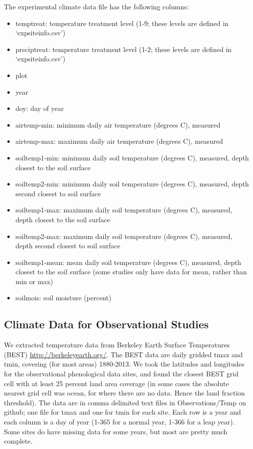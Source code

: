 \documentclass{article}
\begin{document}
The experimental climate data file has the following columns:
\begin{itemize}
  \item temptreat: temperature treatment level (1-9; these levels are defined in `expsiteinfo.csv')
 \item preciptreat: temperature treatment level (1-2; these levels are defined in `expsiteinfo.csv')
 \item plot
 \item year
 \item doy: day of year
 \item airtemp-min: minimum daily air temperature (degrees C), measured
 \item airtemp-max: maximum daily air temperature (degrees C), measured
 \item soiltemp1-min: minimum daily soil temperature (degrees C), measured, depth closest to the soil surface
 \item soiltemp2-min: minimum daily soil temperature (degrees C), measured, depth second closest to soil surface
 \item soiltemp1-max: maximum daily soil temperature (degrees C), measured, depth closest to the soil surface
 \item soiltemp2-max: maximum daily soil temperature (degrees C), measured, depth second closest to soil surface
 \item soiltemp1-mean: mean daily soil temperature (degrees C), measured, depth closest to the soil surface (some studies only have data for mean, rather than min or max)
 \item soilmois: soil moisture (percent)
 
\end{itemize}

\subsection{Climate Data for Observational Studies}

We extracted temperature data from Berkeley Earth Surface Temperatures (BEST) \url{http://berkeleyearth.org/}. The BEST data are daily gridded tmax and tmin, covering (for most areas) 1880-2013. We took the latitudes and longitudes for the observational phenological data sites, and found the closest BEST grid cell with at least 25 percent land area coverage (in some cases the absolute nearest grid cell was ocean, for where there are no data. Hence the land fraction threshold). The data are in comma delimited text files in Observations/Temp on github; one file for tmax and one for tmin for each site. Each row is a year and each column is a day of year (1-365 for a normal year, 1-366 for a leap year). Some sites do have missing data for some years, but most are pretty much complete.
\end{document}
